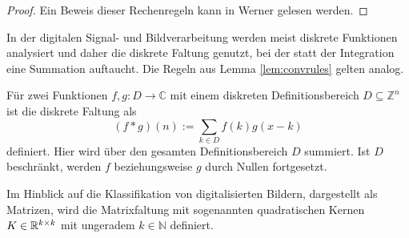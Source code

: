 \begin{proof}
    Ein Beweis dieser Rechenregeln kann in Werner\cite{werner2011funktionalanalysis} gelesen werden.
\end{proof}


In der digitalen Signal- und Bildverarbeitung werden meist diskrete Funktionen analysiert und daher die diskrete Faltung genutzt, bei der statt der Integration eine Summation auftaucht. Die Regeln aus Lemma \ref{lem:convrules} gelten analog.

\begin{defi}\label{disk_faltung}
    Für zwei Funktionen $f,g: D \rightarrow \mathbb{C}$ mit einem diskreten Definitionsbereich $D \subseteq \mathbb{Z}^n$ ist die diskrete Faltung als
    \begin{equation*}
        (f \ast g) (n) := \sum_{k \in D} f(k) g(x-k)
    \end{equation*}
    definiert. Hier wird über den gesamten Definitionsbereich $D$ summiert. Ist $D$ beschränkt, werden $f$ beziehungsweise $g$ durch Nullen fortgesetzt.  
\end{defi}

Im Hinblick auf die Klassifikation von digitalisierten Bildern, dargestellt als Matrizen, wird die Matrixfaltung mit sogenannten quadratischen Kernen $K \in \mathbb{R}^{k \times k}$ mit ungeradem $k \in \mathbb{N}$ definiert.
 
